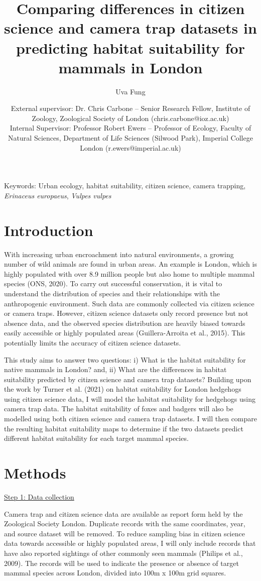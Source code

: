 \documentclass[11pt, a4paper]{article}
\title{Comparing differences in citizen science and camera trap datasets in predicting habitat suitability for mammals in London}
\author{Uva Fung}
\date{%
    External supervisor: Dr. Chris Carbone -- Senior Research Fellow, Institute of Zoology, Zoological Society of London (chris.carbone@ioz.ac.uk)\\%
    Internal Supervisor: Professor Robert Ewers -- Professor of Ecology, Faculty of Natural Sciences, Department of Life Sciences (Silwood Park), Imperial College London (r.ewers@imperial.ac.uk)\\[2ex]%
}
\begin{document}
  \maketitle
\newpage

\linenumbers

Keywords: Urban ecology, habitat suitability, citizen science, camera trapping, \textit{Erinaceus europaeus}, \textit{Vulpes vulpes}

\section{Introduction}
With increasing urban encroachment into natural environments, a growing number of wild animals are found in urban areas. An example is London, which is highly populated with over 8.9 million people but also home to multiple mammal species (ONS, 2020). To carry out successful conservation, it is vital to understand the distribution of species and their relationships with the anthropogenic environment. Such data are commonly collected via citizen science or camera traps. However, citizen science datasets only record presence but not absence data, and the observed species distribution are heavily biased towards easily accessible or highly populated areas (Guillera-Arroita et al., 2015). This potentially limits the accuracy of citizen science datasets. 

This study aims to answer two questions: i) What is the habitat suitability for native mammals in London? and, ii) What are the differences in habitat suitability predicted by citizen science and camera trap datasets? Building upon the work by Turner et al. (2021) on habitat suitability for London hedgehogs using citizen science data, I will model the habitat suitability for hedgehogs using camera trap data. The habitat suitability of foxes and badgers will also be modelled using both citizen science and camera trap datasets. I will then compare the resulting habitat suitability maps to determine if the two datasets predict different habitat suitability for each target mammal species. 


\section{Methods}

\underline{Step 1: Data collection} 

Camera trap and citizen science data are available as report form held by the Zoological Society London. Duplicate records with the same coordinates, year, and source dataset will be removed. To reduce sampling bias in citizen science data towards accessible or highly populated areas, I will only include records that have also reported sightings of other commonly seen mammals (Philips et al., 2009). The records will be used to indicate the presence or absence of target mammal species across London, divided into 100m x 100m grid squares. 
\vspace{\baselineskip}
\end{document}
